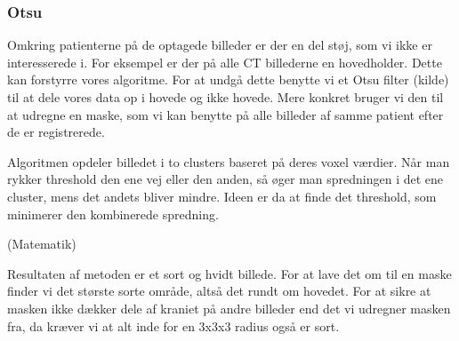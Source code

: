 \subsubsection{Otsu}

Omkring patienterne på de optagede billeder er der en del støj, som vi ikke
er interesserede i. For eksempel er der på alle CT billederne en hovedholder.
Dette kan forstyrre vores algoritme. For at undgå dette benytte vi et Otsu
filter (kilde) til at dele vores data op i hovede og ikke hovede. Mere konkret
bruger vi den til at udregne en maske, som vi kan benytte på alle billeder af
samme patient efter de er registrerede. 

Algoritmen opdeler billedet i to clusters baseret på deres voxel værdier. Når
man rykker threshold den ene vej eller den anden, så øger man spredningen i
det ene cluster, mens det andets bliver mindre. Ideen er da at finde det
threshold, som minimerer den kombinerede spredning. 

(Matematik)

Resultaten af metoden er et sort og hvidt billede. For at lave det om til en
maske finder vi det største sorte område, altså det rundt om hovedet. For
at sikre at masken ikke dækker dele af kraniet på andre billeder end det vi
udregner masken fra, da kræver vi at alt inde for en 3x3x3 radius også er sort. 
